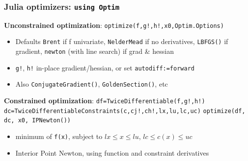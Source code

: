 \documentclass[bigger]{beamer}
\begin{document}
\begin{frame}%

\frametitle{Julia optimizers: \texttt{using Optim} }

\textbf{Unconstrained optimization}:\newline
\qquad \texttt{optimize(f,g!,h!,x0,Optim.Options)}
\begin{itemize}
\item Defaults \texttt{Brent} if f univariate, \texttt{NelderMead} if no derivatives, \texttt{LBFGS()} if gradient, \texttt{newton} (with line search) if grad \& hessian  
\item \texttt{g!}, \texttt{h!} in-place gradient/hessian, or set \texttt{autodiff:=forward}
\item Also \texttt{ConjugateGradient()}, \texttt{GoldenSection()}, etc

\end{itemize}

\textbf{Constrained optimization}:\newline
\qquad \texttt{df=TwiceDifferentiable(f,g!,h!)}
\qquad \texttt{dc=TwiceDifferentiableConstraints(c,cj!,ch!,lx,lu,lc,uc)}\newline
\qquad \texttt{optimize(df, dc, x0, IPNewton())}

\begin{itemize}
\item minimum of \texttt{f(x)}, subject to $lx\leq x\leq lu$, $lc\leq c(x)\leq uc$

\item Interior Point Newton, using function and constraint derivatives
\end{itemize}

\end{frame}%
\end{document}
